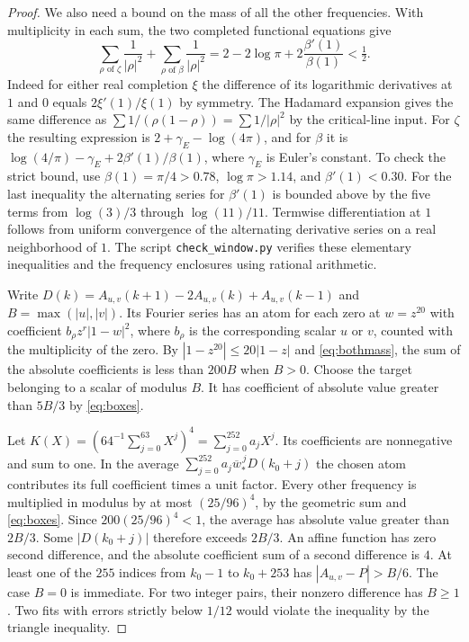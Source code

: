 \begin{proof}
We also need a bound on the mass of all the other frequencies. With
multiplicity in each sum, the two completed functional equations give
\begin{equation}
 \sum_{\rho\text{ of }\zeta}\frac1{|\rho|^2}
 +\sum_{\rho\text{ of }\beta}\frac1{|\rho|^2}
   =2-2\log\pi+2\frac{\beta'(1)}{\beta(1)}<\tfrac12 .
 \label{eq:bothmass}
\end{equation}
Indeed for either real completion $\xi$ the difference of its logarithmic
derivatives at $1$ and $0$ equals $2\xi'(1)/\xi(1)$ by symmetry.
The Hadamard expansion gives the same difference as
$\sum 1/(\rho(1-\rho))=\sum 1/|\rho|^2$ by the critical-line input.
For $\zeta$ the resulting expression is $2+\gamma_E-\log(4\pi)$, and for
$\beta$ it is $\log(4/\pi)-\gamma_E+2\beta'(1)/\beta(1)$, where
$\gamma_E$ is Euler's constant. To check the strict bound, use
$\beta(1)=\pi/4>0.78$, $\log\pi>1.14$, and $\beta'(1)<0.30$.
For the last inequality the alternating series for $\beta'(1)$ is bounded
above by the five terms from $\log(3)/3$ through $\log(11)/11$.
Termwise differentiation at $1$ follows from uniform convergence of the
alternating derivative series on a real neighborhood of $1$.
The script \texttt{check\_window.py} verifies these elementary
inequalities and the frequency enclosures using rational arithmetic.

Write $D(k)=A_{u,v}(k+1)-2A_{u,v}(k)+A_{u,v}(k-1)$ and
$B=\max(|u|,|v|)$. Its Fourier series has an atom for each zero at
$w=z^{20}$ with coefficient $b_\rho z^r|1-w|^2$, where $b_\rho$ is the
corresponding scalar $u$ or $v$, counted with the multiplicity of the zero.
By $|1-z^{20}|\le20|1-z|$ and \eqref{eq:bothmass}, the sum of the absolute
coefficients is less than $200B$ when $B>0$. Choose the target belonging to
a scalar of modulus $B$. It has coefficient of absolute value greater
than $5B/3$ by \eqref{eq:boxes}.

Let $K(X)=(64^{-1}\sum_{j=0}^{63}X^j)^4=\sum_{j=0}^{252}a_jX^j$.
Its coefficients are nonnegative and sum to one. In the average
$\sum_{j=0}^{252}a_j\overline w_*^{\,j}D(k_0+j)$ the chosen atom contributes
its full coefficient times a unit factor. Every other frequency is
multiplied in modulus by at most $(25/96)^4$, by the geometric sum and
\eqref{eq:boxes}. Since $200(25/96)^4<1$, the average has absolute
value greater than $2B/3$. Some $|D(k_0+j)|$ therefore exceeds $2B/3$.
An affine function has zero second difference, and the absolute coefficient
sum of a second difference is $4$. At least one of the $255$ indices
from $k_0-1$ to $k_0+253$ has $|A_{u,v}-P|>B/6$.
The case $B=0$ is immediate. For two integer pairs, their nonzero difference
has $B\ge1$. Two fits with errors strictly below $1/12$ would violate the
inequality by the triangle inequality.
\end{proof}
